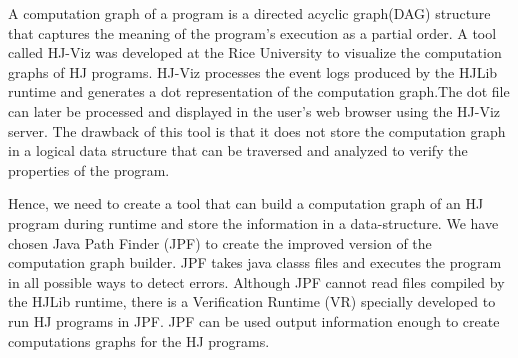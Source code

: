  A computation graph of a program is a directed acyclic graph(DAG) structure that captures the meaning of the program's execution as a partial order. A tool called HJ-Viz was developed at the Rice University to visualize the computation graphs of HJ programs. HJ-Viz processes the event logs produced by the HJLib runtime and generates a dot representation of the computation graph.The dot file can later be processed and displayed in the user's web browser using the HJ-Viz server. The drawback of this tool is that it does not store the computation graph in a logical data structure that can be traversed and analyzed  to verify the properties of the program. 
 
 Hence, we need to create a tool that can build a computation graph of an HJ program during runtime and store the information in a data-structure. We have chosen Java Path Finder (JPF) to create the improved version of the computation graph builder.  JPF takes java classs files and executes the program in all possible ways to detect errors. Although JPF cannot read files compiled by the HJLib runtime, there is a Verification Runtime (VR) specially developed to run HJ programs in JPF. JPF can be used output information enough to create computations graphs for the HJ programs.

